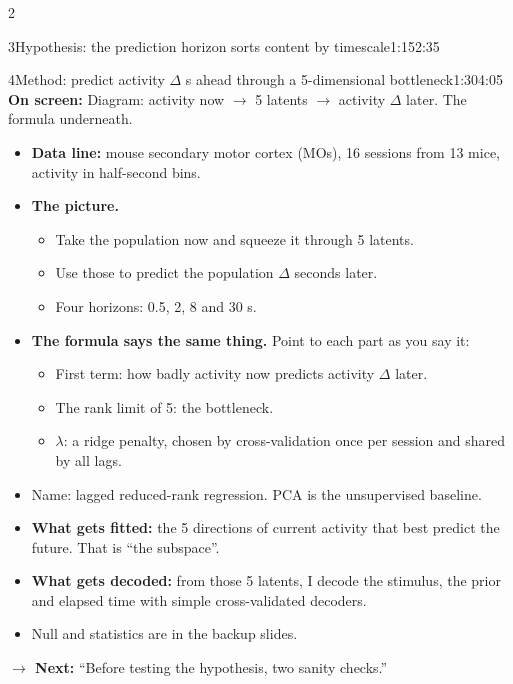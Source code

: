 \documentclass[10pt]{article}
\newcommand{\point}[1]{{\color{ink}\textbf{On screen:} #1}\par}
\newcommand{\bridge}[1]{\par{\color{accent}\textbf{$\rightarrow$ Next:} #1}\par}
\begin{document}
\begin{multicols}{2}
\begin{slidebox}{3}{Hypothesis: the prediction horizon sorts content by timescale}{1:15}{2:35}
\end{slidebox}
\begin{slidebox}{4}{Method: predict activity $\Delta$ s ahead through a 5-dimensional bottleneck}{1:30}{4:05}
\point{Diagram: activity now $\to$ 5 latents $\to$ activity $\Delta$ later. The formula underneath.}
\begin{itemize}
\item \textbf{Data line:} mouse secondary motor cortex (MOs), 16 sessions from 13 mice, activity in half-second bins.
\item \textbf{The picture.}
  \begin{itemize}
  \item Take the population now and squeeze it through 5 latents.
  \item Use those to predict the population $\Delta$ seconds later.
  \item Four horizons: 0.5, 2, 8 and 30 s.
  \end{itemize}
\item \textbf{The formula says the same thing.} Point to each part as you say it:
  \begin{itemize}
  \item First term: how badly activity now predicts activity $\Delta$ later.
  \item The rank limit of 5: the bottleneck.
  \item $\lambda$: a ridge penalty, chosen by cross-validation once per session and shared by all lags.
  \end{itemize}
\item Name: lagged reduced-rank regression. PCA is the unsupervised baseline.
\item \textbf{What gets fitted:} the 5 directions of current activity that best predict the future. That is
``the subspace''.
\item \textbf{What gets decoded:} from those 5 latents, I decode the stimulus, the prior and elapsed time with simple
cross-validated decoders.
\item Null and statistics are in the backup slides.
\end{itemize}
\bridge{``Before testing the hypothesis, two sanity checks.''}


\end{slidebox}
\end{multicols}
\end{document}
